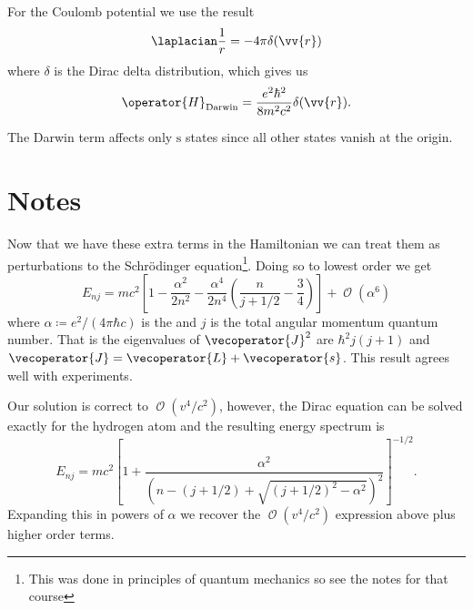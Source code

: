 \documentclass[fleqn]{NotesClass}
\newcommand*{\order}{\mathop{\mathcal{O}}}
\newcommand*{\hamiltonian}{H}
\begin{document}
    For the Coulomb potential we use the result
    \begin{equation}
        \laplacian \frac{1}{r} = -4\pi \delta(\vv{r})
    \end{equation}
    where \(\delta\) is the Dirac delta distribution, which gives us
    \begin{equation}
        \operator{\hamiltonian}_{\mathrm{Darwin}} = \frac{e^2\hbar^2}{8m^2c^2}\delta(\vv{r}).
    \end{equation}
    
    The Darwin term affects only \(\mathrm{s}\) states since all other states vanish at the origin.
    
    \section{Notes}
    Now that we have these extra terms in the Hamiltonian we can treat them as perturbations to the Schr\"odinger equation\footnote{This was done in principles of quantum mechanics so see the notes for that course}.
    Doing so to lowest order we get
    \begin{equation}
        E_{nj} = mc^2\left[ 1 - \frac{\alpha^2}{2n^2} - \frac{\alpha^4}{2n^4}\left( \frac{n}{j + 1/2} - \frac{3}{4} \right) \right] + \order(\alpha^6)
    \end{equation}
    where \(\alpha \coloneqq e^2/(4\pi \hbar c)\) is the  and \(j\) is the total angular momentum quantum number.
    That is the eigenvalues of \(\vecoperator{J}^2\) are \(\hbar^2 j(j + 1)\) and \(\vecoperator{J} = \vecoperator{L} + \vecoperator{s}\).
    This result agrees well with experiments.
    
    Our solution is correct to \(\order(v^4/c^2)\), however, the Dirac equation can be solved exactly for the hydrogen atom and the resulting energy spectrum is
    \begin{equation}
        E_{nj} = mc^2\left[ 1 + \frac{\alpha^2}{(n - (j + 1/2) + \sqrt{(j + 1/2)^2 - \alpha^2})^2} \right]^{-1/2}.
    \end{equation}
    Expanding this in powers of \(\alpha\) we recover the \(\order(v^4/c^2)\) expression above plus higher order terms.
    
\end{document}
